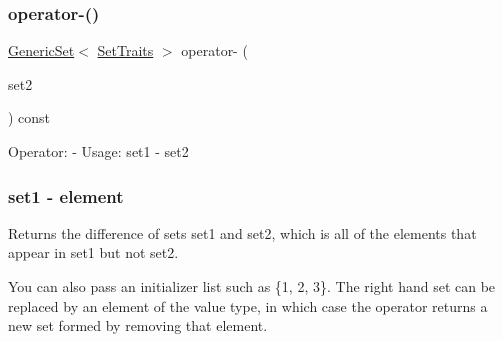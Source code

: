 \mbox{\label{classstanfordcpplib_1_1collections_1_1GenericSet_a5996e7e22f84d81f44c2402c2493d43b}} 
\subsubsection{\texorpdfstring{operator-\/()}{operator-()}\hspace{0.1cm}{\footnotesize\ttfamily [1/2]}}
{\footnotesize\ttfamily \mbox{\hyperlink{classstanfordcpplib_1_1collections_1_1GenericSet}{Generic\+Set}}$<$ \mbox{\hyperlink{structstanfordcpplib_1_1collections_1_1SetTraits}{Set\+Traits}} $>$ operator-\/ (\begin{DoxyParamCaption}\item[{const \mbox{\hyperlink{classstanfordcpplib_1_1collections_1_1GenericSet}{Generic\+Set}}$<$ \mbox{\hyperlink{structstanfordcpplib_1_1collections_1_1SetTraits}{Set\+Traits}} $>$ \&}]{set2 }\end{DoxyParamCaption}) const}



Operator\+: -\/ Usage\+: set1 -\/ set2 \subsubsection*{set1 -\/ element }

Returns the difference of sets {\ttfamily set1} and {\ttfamily set2}, which is all of the elements that appear in {\ttfamily set1} but not {\ttfamily set2}. 

You can also pass an initializer list such as \{1, 2, 3\}. The right hand set can be replaced by an element of the value type, in which case the operator returns a new set formed by removing that element. \mbox{\label{classstanfordcpplib_1_1collections_1_1GenericSet_a4c09cbefc6834fc9010e209c8ce90765}} 
